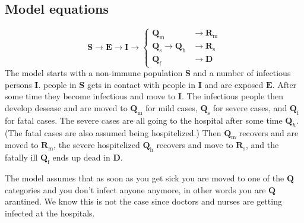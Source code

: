 \documentclass[twoside,11pt]{article}
\newcommand {\hpil}{\rightarrow}
\newcommand{\rmf}{\mathrm{f}}
\newcommand{\rmh}{\mathrm{h}}
\newcommand{\rmm}{\mathrm{m}}
\newcommand{\rms}{\mathrm{s}}
\newcommand{\bmD}{{\mathbf{D}}}
\newcommand{\bmE}{{\mathbf{E}}}
\newcommand{\bmI}{{\mathbf{I}}}
\newcommand{\bmQ}{{\mathbf{Q}}}
\newcommand{\bmR}{{\mathbf{R}}}
\newcommand{\bmS}{{\mathbf{S}}}
\begin{document}
\newcommand{\Tinc}  {\tau_\textrm{inc}}
\newcommand{\Tinf}  {\tau_\textrm{inf}}
\newcommand{\Tdeath}{\tau_\textrm{death}}
\newcommand{\Trecm} {\tau_\textrm{recm}}
\newcommand{\Trecs} {\tau_\textrm{recs}}
\newcommand{\Thosp} {\tau_\textrm{hosp}}
\newcommand{\Tint}  {\tau_\textrm{intervention}}
\newcommand{\Ttd}   {\tau_\textrm{2death}}


\subsection{Model equations}
%
\begin{equation}
 \bmS \hpil \bmE \hpil \bmI \hpil
\begin{cases}
\bmQ_\rmm                     &  \hpil \bmR_\rmm  \\
\bmQ_\rms    \hpil \bmQ_\rmh  &  \hpil \bmR_\rms  \\
\bmQ_\rmf                     &  \hpil \bmD
\end{cases}
\label{eq:}
\end{equation}
%
The model starts with a non-immune population $\bmS$ and a number of infectious persons $\bmI$. people in $\bmS$ gets in contact with people
in $\bmI$ and are exposed $\bmE$.  After some time they become infectious and move to $\bmI$.  The infectious people then develop desease
and are moved to $\bmQ_\rmm$ for mild cases, $\bmQ_\rms$ for severe cases, and $\bmQ_\rmf$ for fatal cases. The severe cases are all
going to the hospital after some time $\bmQ_h$. (The fatal cases are also assumed being hospitelized.) Then $\bmQ_\rmm$ recovers and
are moved to $\bmR_\rmm$, the severe hospitelized $\bmQ_\rmh$ recovers and move to $\bmR_\rms$, and the fatally ill $\bmQ_\rmf$ ends
up dead  in $\bmD$. 

The model assumes that as soon as you get sick you are moved to one of the $\bmQ$ categories and you don't infect anyone anymore, in other words
you are $\bmQ$arantined. We know this is not the case since doctors and nurses are getting infected at the hospitals.
\end{document}
